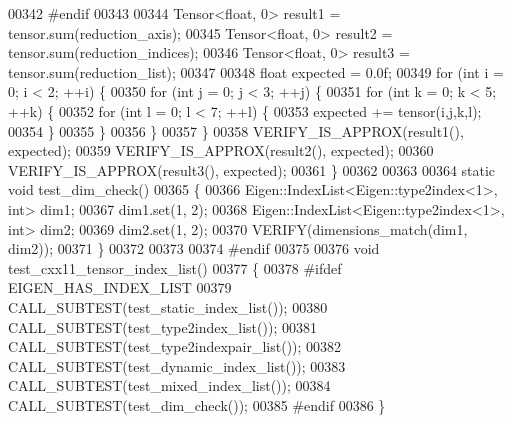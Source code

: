 \begin{DoxyCode}
00342 \textcolor{preprocessor}{#endif}
00343 
00344   Tensor<float, 0> result1 = tensor.sum(reduction\_axis);
00345   Tensor<float, 0> result2 = tensor.sum(reduction\_indices);
00346   Tensor<float, 0> result3 = tensor.sum(reduction\_list);
00347 
00348   \textcolor{keywordtype}{float} expected = 0.0f;
00349   \textcolor{keywordflow}{for} (\textcolor{keywordtype}{int} i = 0; i < 2; ++i) \{
00350     \textcolor{keywordflow}{for} (\textcolor{keywordtype}{int} j = 0; j < 3; ++j) \{
00351       \textcolor{keywordflow}{for} (\textcolor{keywordtype}{int} k = 0; k < 5; ++k) \{
00352         \textcolor{keywordflow}{for} (\textcolor{keywordtype}{int} l = 0; l < 7; ++l) \{
00353           expected += tensor(i,j,k,l);
00354         \}
00355       \}
00356     \}
00357   \}
00358   VERIFY\_IS\_APPROX(result1(), expected);
00359   VERIFY\_IS\_APPROX(result2(), expected);
00360   VERIFY\_IS\_APPROX(result3(), expected);
00361 \}
00362 
00363 
00364 \textcolor{keyword}{static} \textcolor{keywordtype}{void} test\_dim\_check()
00365 \{
00366   Eigen::IndexList<Eigen::type2index<1>, \textcolor{keywordtype}{int}> dim1;
00367   dim1.set(1, 2);
00368   Eigen::IndexList<Eigen::type2index<1>, \textcolor{keywordtype}{int}> dim2;
00369   dim2.set(1, 2);
00370   VERIFY(dimensions\_match(dim1, dim2));
00371 \}
00372 
00373 
00374 \textcolor{preprocessor}{#endif}
00375 
00376 \textcolor{keywordtype}{void} test\_cxx11\_tensor\_index\_list()
00377 \{
00378 \textcolor{preprocessor}{#ifdef EIGEN\_HAS\_INDEX\_LIST}
00379   CALL\_SUBTEST(test\_static\_index\_list());
00380   CALL\_SUBTEST(test\_type2index\_list());
00381   CALL\_SUBTEST(test\_type2indexpair\_list());
00382   CALL\_SUBTEST(test\_dynamic\_index\_list());
00383   CALL\_SUBTEST(test\_mixed\_index\_list());
00384   CALL\_SUBTEST(test\_dim\_check());
00385 \textcolor{preprocessor}{#endif}
00386 \}
\end{DoxyCode}
